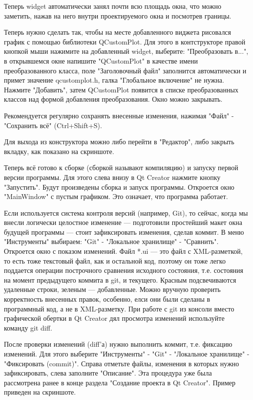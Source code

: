 Теперь widget автоматически занял почти всю площадь окна, что можно заметить, нажав на него внутри проектируемого окна и посмотрев границы.

Теперь нужно сделать так, чтобы на месте добавленного виджета рисовался график с помощью библиотеки QCustomPlot. Для этого в контструкторе правой кнопкой мыши нажимите на добавленный widget, выберите: "Преобразовать в...", в открывшемся окне напишите "QCustomPlot" в качестве имени преобразованного класса, поле "Заголовочный файл" заполнится автоматически и примет значение qcustomplot.h, галка "Глобальное включение" не нужна. Нажмите "Добавить", затем QCustomPlot появится в списке преобразованных классов над формой добавления преобразования. Окно можно закрывать.

Рекомендуется регулярно сохранять внесенные изменения, нажимая "Файл" - "Сохранить всё" (Ctrl+Shift+S).

Для выхода из конструктора можно либо перейти в "Редактор", либо закрыть вкладку, как показано на скриншоте.

Теперь всё готово к сборке (сборкой называют компиляцию) и запуску первой версии программы. Для этого слева внизу в Qt Creator нажмите кнопку "Запустить". Будут произведены сборка и запуск программы. Откроется окно "MainWindow" с пустым графиком. Это означает, что программа работает.

Если используется система контроля версий (например, Git), то сейчас, когда мы внесли логически целостное изменение — подготовили простейший макет окна будущей программы — стоит зафиксировать изменения, сделав коммит. В меню "Инструменты" выбираем: "Git" - "Локальное хранилище" - "Сравнить". Откроется окно с показом изменений. Файл *.ui — это файл с XML-разметкой, то есть тоже текстовый файл, как и остальной код, поэтому он тоже легко поддается операции построчного сравнения исходного состояния, т.е. состояния на момент предыдущего коммита в git, и текущего. Красным подсвечиваются удаленные строки, зеленым — добавленные. Можно вручную проверить корректность внесенных правок, особенно, елси они были сделаны в программный код, а не в XML-разметку. При работе с git из консоли вместо графической обертки в Qt Creator дял просмотра изменений используйте команду git diff.

После проверки изменений (diff'а) нужно выполнить коммит, т.е. фиксацию изменений. Для этого выберите "Инструменты" - "Git" - "Локальное хранилище" - "Фиксировать (commit)". Справа отметьте файлы, изменения в которых нужно зафиксировать, слева заполните "Описание". Эта процедура уже была рассмотрена ранее в конце раздела "Создание проекта в Qt Creator". Пример приведен на скриншоте.

\clearpage
